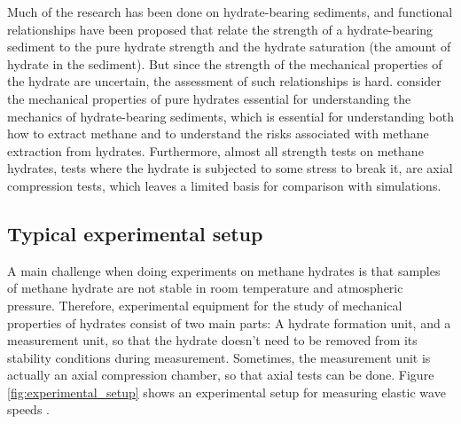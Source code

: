 Much of the research has been done on hydrate-bearing sediments, and functional relationships have been proposed that relate the strength of a hydrate-bearing sediment to the pure hydrate strength and the hydrate saturation (the amount of hydrate in the sediment). But since the strength of the mechanical properties of the hydrate are uncertain, the assessment of such relationships is hard. \citet{Ning2012} consider the mechanical properties of pure hydrates essential for understanding the mechanics of hydrate-bearing sediments, which is essential for understanding both how to extract methane and to understand the risks associated with methane extraction from hydrates. Furthermore, almost all strength tests on methane hydrates, tests where the hydrate is subjected to some stress to break it, are axial compression tests, which leaves a limited basis for comparison with simulations. 

\subsection{Typical experimental setup}
A main challenge when doing experiments on methane hydrates is that samples of methane hydrate are not stable in room temperature and atmospheric pressure. Therefore, experimental equipment for the study of mechanical properties of hydrates consist of two main parts: A hydrate formation unit, and a measurement unit, so that the hydrate doesn't need to be removed from its stability conditions during measurement. Sometimes, the measurement unit is actually an axial compression chamber, so that axial tests can be done. Figure \ref{fig:experimental_setup} shows an experimental setup for measuring elastic wave speeds \cite{Waite2000}.

